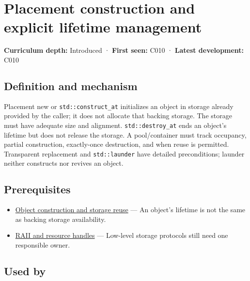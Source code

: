 \hypertarget{appendix-f56c3e43fd4e}{}\label{referencestart:appendix-f56c3e43fd4e}
\section{Placement construction and explicit lifetime management}\label{appendix-f56c3e43fd4e-placement-construction-and-explicit-lifetime-management}

\textbf{Curriculum depth:} Introduced · \textbf{First seen:} C010 · \textbf{Latest development:} C010

\begin{allmightroledefinition}

\subsection{Definition and mechanism}\label{appendix-f56c3e43fd4e-definition-and-mechanism}

Placement new or \texttt{std::construct\_at} initializes an object in storage already provided by the caller; it does not allocate that backing storage. The storage must have adequate size and alignment. \texttt{std::destroy\_at} ends an object's lifetime but does not release the storage. A pool/container must track occupancy, partial construction, exactly-once destruction, and when reuse is permitted. Transparent replacement and \texttt{std::launder} have detailed preconditions; launder neither constructs nor revives an object.

\end{allmightroledefinition}

\subsection{Prerequisites}\label{appendix-f56c3e43fd4e-prerequisites}

\begin{itemize}
\tightlist
\item
  \hyperref[appendix-a82f9c438857]{Object construction and storage reuse} --- An object's lifetime is not the same as backing storage availability.
\item
  \hyperref[appendix-69739d3ab49b]{RAII and resource handles} --- Low-level storage protocols still need one responsible owner.
\end{itemize}

\subsection{Used by}\label{appendix-f56c3e43fd4e-used-by}


